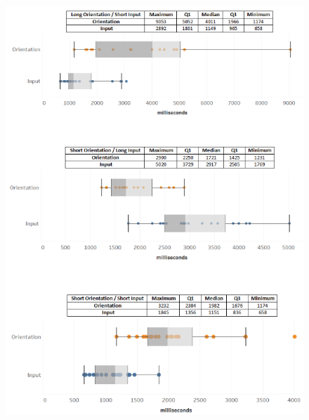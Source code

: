 \begin{figure}[t!]
\centering
\includegraphics[width=14cm, height=20cm]{Chapters/graphics/Times.png}
\caption{}
\label{fig:times}
\end{figure}
